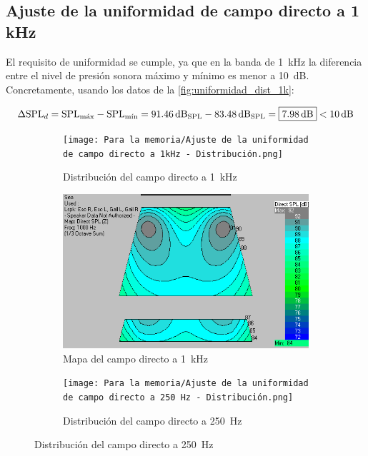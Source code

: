 \documentclass{article}
\begin{document}
\subsection{Ajuste de la uniformidad de campo directo a 1 kHz}

El requisito de uniformidad se cumple, ya que en la banda de \qty{1}{\kilo \hertz } la diferencia entre el nivel de presión sonora máximo y mínimo es menor a \qty{10}{\dB}. Concretamente, usando los datos de la \autoref{fig:uniformidad_dist_1k}:

\[ \Delta \text{SPL}_d = \text{SPL} _{\textnormal{máx}} - \text{SPL} _{\textnormal{mín}} = \qty{91.46}{\dB_{\text{SPL}}} - \qty{83.48}{\dB_{\text{SPL}}} = \boxed{\qty{7.98}{\dB}} < \qty{10}{\dB} \]

\begin{figure}[H]
    \centering
    \begin{subfigure}[b]{0.45\linewidth}
        \texttt{[image: Para la memoria/Ajuste de la uniformidad de campo directo a 1kHz - Distribución.png]}
        \caption{Distribución del campo directo a \qty{1}{\kilo \hertz}}
        \label{fig:uniformidad_dist_1k}
    \end{subfigure}
    \begin{subfigure}[b]{0.45\linewidth}
        \includegraphics[width=\linewidth]{Para la memoria/Ajuste de la uniformidad de campo directo a 1kHz - Mapa.png}
        \caption{Mapa del campo directo a \qty{1}{\kilo \hertz}}
        \label{fig:uniformidad_mapa_1k}
    \end{subfigure}
    \begin{subfigure}[b]{0.45\linewidth}
        \texttt{[image: Para la memoria/Ajuste de la uniformidad de campo directo a 250 Hz - Distribución.png]}
        \caption{Distribución del campo directo a \qty{250}{\hertz}}

\end{subfigure}
\end{figure}
\end{document}
